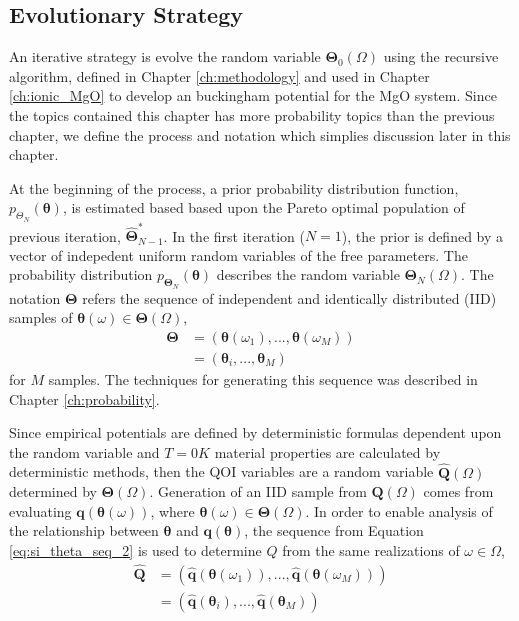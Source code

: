 \subsection{Evolutionary Strategy}

An iterative strategy is evolve the random variable $\bm{\Theta}_0(\Omega)$ using the recursive algorithm, defined in Chapter \ref{ch:methodology} and used in Chapter \ref{ch:ionic_MgO} to develop an buckingham potential for the MgO system.  Since the topics contained this chapter has more probability topics than the previous chapter, we define the process and notation which simplies discussion later in this chapter.

At the beginning of the process, a prior probability distribution function, $p_{\Theta_N}(\bm{\theta})$, is estimated based based upon the Pareto optimal population of previous iteration, $\hat{\bm{\Theta}}_{N-1}^*$.
In the first iteration ($N=1$), the prior is defined by a vector of indepedent uniform random variables of the free parameters.
The probability distribution $p_{\bm{\Theta}_N}(\bm{\theta})$ describes the random variable $\bm{\Theta}_{N}(\Omega)$.
The notation $\bm{\Theta}$ refers the sequence of independent and identically distributed (IID) samples of $\bm{\theta}(\omega) \in \bm{\Theta}(\Omega)$,
\begin{subequations}
  \begin{align}
     \bm{\Theta}
       &= (\bm{\theta}(\omega_1),
           ...,
           \bm{\theta}(\omega_M))
      \label{eq:si_theta_seq_1} \\
       &= (\bm{\theta}_i,
           ...,
           \bm{\theta}_M)
      \label{eq:si_theta_seq_2}
  \end{align}
\end{subequations}
for $M$ samples.
The techniques for generating this sequence was described in Chapter \ref{ch:probability}.

Since empirical potentials are defined by deterministic formulas dependent upon the random variable and $T=0K$ material properties are calculated by deterministic methods, then the QOI variables are a random variable $\hat{\bm{Q}}(\Omega)$ determined by $\bm{\Theta}(\Omega)$.
Generation of an IID sample from $\bm{Q}(\Omega)$ comes from evaluating $\bm{q}(\bm{\theta}(\omega))$, where $\bm{\theta}(\omega) \in \bm{\Theta}(\Omega)$.
In order to enable analysis of the relationship between $\bm{\theta}$ and $\bm{q}(\bm{\theta})$, the sequence from Equation \ref{eq:si_theta_seq_2} is used to determine $Q$ from the same realizations of $\omega \in \Omega$,
\begin{subequations}
  \begin{align}
     \hat{\bm{Q}}
       &= (\hat{\bm{q}}(\bm{\theta}(\omega_1)),
           ...,
           \hat{\bm{q}}(\bm{\theta}(\omega_M))
          )
      \label{eq:si_qoi_seq_1} \\
       &= (\hat{\bm{q}}(\bm{\theta}_i),
           ...,
           \hat{\bm{q}}(\bm{\theta}_M)
          )
      \label{eq:si_qoi_seq_2}
  \end{align}
\end{subequations}

